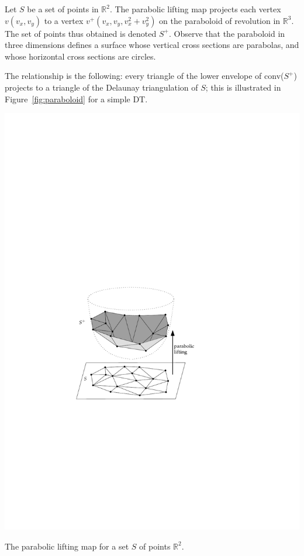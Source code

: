 Let $S$ be a set of points in $\mathbb{R}^{2}$. 
The parabolic lifting map projects each vertex $v(v_{x}, v_{y})$ to a vertex $v^{+}(v_{x}, v_{y}, v_{x}^{2}+v_{y}^{2})$ on the paraboloid of revolution in $\mathbb{R}^{3}$. 
The set of points thus obtained is denoted $S^{+}$. 
Observe that the paraboloid in three dimensions defines a surface whose vertical cross sections are parabolas, and whose horizontal cross sections are circles. 

%

The relationship is the following: every triangle of the lower envelope of conv($S^{+}$) projects to a triangle of the Delaunay triangulation of $S$; this is illustrated in Figure~\ref{fig:paraboloid} for a simple DT\@. 
\begin{marginfigure}
  \centering
  \includegraphics[width=\textwidth]{paraboloid}
  \caption{The parabolic lifting map for a set $S$ of points $\mathbb{R}^2$.}%
\label{fig:paraboloid}
\end{marginfigure}

